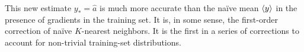 \documentclass[modern]{aastex63}
\begin{document}
This new estimate $y_\ast=\hat{a}$ is much more accurate than the na\"ive mean $\left\langle y \right\rangle$
in the presence of gradients in the training set.
It is, in some sense, the first-order correction of na\"ive $K$-nearest
neighbors. It is the first in a series of corrections to account for non-trivial
training-set distributions.



\end{document}
